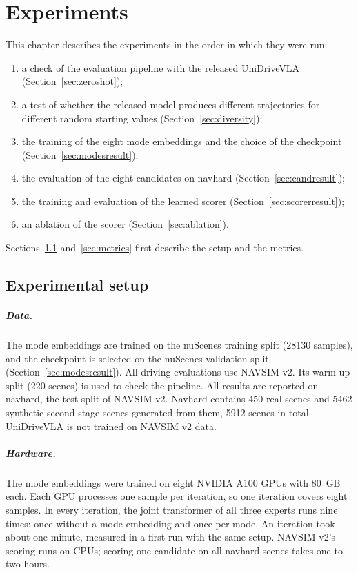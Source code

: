 \documentclass[11pt, a4paper, oneside]{book}
\begin{document}
\chapter{Experiments}
\label{ch:experiments}
This chapter describes the experiments in the order in which they were run:
\begin{enumerate}
  \item a check of the evaluation pipeline with the released UniDriveVLA
  (Section~\ref{sec:zeroshot});
  \item a test of whether the released model produces different trajectories for different
  random starting values (Section~\ref{sec:diversity});
  \item the training of the eight mode embeddings and the choice of the checkpoint
  (Section~\ref{sec:modesresult});
  \item the evaluation of the eight candidates on navhard (Section~\ref{sec:candresult});
  \item the training and evaluation of the learned scorer (Section~\ref{sec:scorerresult});
  \item an ablation of the scorer (Section~\ref{sec:ablation}).
\end{enumerate}
Sections~\ref{sec:setup} and~\ref{sec:metrics} first describe the setup and the metrics.

\section{Experimental setup}
\label{sec:setup}

\paragraph{Data.} The mode embeddings are trained on the nuScenes training split
(\num{28130} samples), and the checkpoint is selected on the nuScenes validation split
(Section~\ref{sec:modesresult}). All driving evaluations use NAVSIM v2. Its warm-up split (220 scenes) is used to
check the pipeline. All results are reported on navhard, the test split of NAVSIM v2. Navhard
contains 450 real scenes and \num{5462} synthetic second-stage scenes generated from them,
\num{5912} scenes in total. UniDriveVLA is not trained on NAVSIM v2 data.

\paragraph{Hardware.} The mode embeddings were trained on eight NVIDIA A100 GPUs with
\SI{80}{GB} each. Each GPU processes one sample per iteration, so one iteration covers eight
samples. In every iteration, the joint transformer of all three experts runs nine times: once
without a mode embedding and once per mode. An iteration took about one minute, measured in a
first run with the same setup. NAVSIM v2's scoring runs on CPUs; scoring one candidate on all
navhard scenes takes one to two hours.
\end{document}
